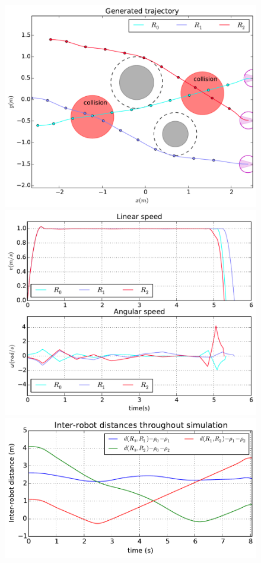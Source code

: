 \documentclass[eprint]{actapoly}
\begin{document}
\begin{figure}[!h]\centering
  \includegraphics[width=\linewidth]{./images/collision/multirobot-path.pdf} %
  \\[1mm]
  \includegraphics[width=\linewidth]{./images/collision/multirobot-vw.pdf} %
  \includegraphics[width=\linewidth]{./images/collision/multirobot-interr.pdf} %

\end{figure}
\end{document}
